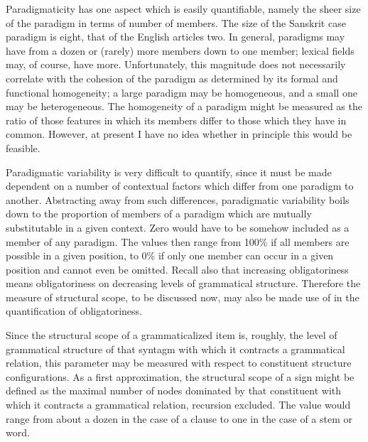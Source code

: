 Paradigmaticity has one aspect which is easily quantifiable, namely the sheer size of the paradigm in terms of number of members. The size of the Sanskrit case paradigm is eight, that of the English articles two. In general, paradigms may have from a dozen or (rarely) more members down to one member; lexical fields may, of course, have more. Unfortunately, this magnitude does not necessarily correlate with the cohesion of the paradigm as determined by its formal and functional homogeneity; a large paradigm may be homogeneous, and a small one may be heterogeneous. The homogeneity of a paradigm might be measured as the ratio of those features in which its members differ to those which they have in common. However, at present I have no idea whether in principle this would be feasible.

Paradigmatic variability is very difficult to quantify, since it must be made dependent on a number of contextual factors which differ from one paradigm to another. Abstracting away from such differences, paradigmatic variability boils down to the proportion of members of a paradigm which are mutually substitutable in a given context. Zero would have to be somehow included as a member of any paradigm. The values then range from 100\% if all members are possible in a given position, to 0\% if only one member can occur in a given position and cannot even be omitted. Recall also that increasing obligatoriness means obligatoriness on decreasing levels of grammatical structure. Therefore the measure of structural scope, to be discussed now, may also be made use of in the quantification of obligatoriness.

Since the structural scope of a grammaticalized item is, roughly, the level of grammatical structure of that syntagm with which it contracts a grammatical relation, this parameter may be measured with respect to constituent structure configurations. As a first approximation, the structural scope of a sign might be defined as the maximal number of nodes dominated by that constituent with which it contracts a grammatical relation, recursion excluded. The value would range from about a dozen in the case of a clause to one in the case of a stem or word.

